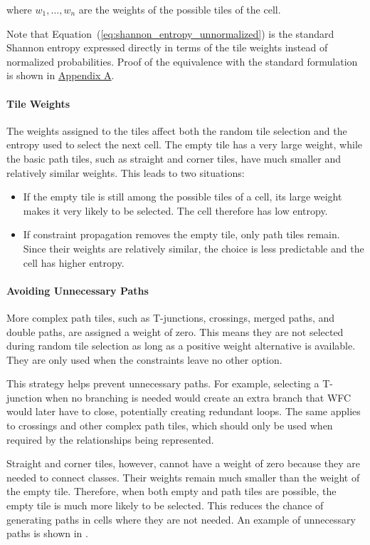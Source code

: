 \documentclass[../../main.tex]{subfiles}
\begin{document}
where $w_1,\ldots,w_n$ are the weights of the possible tiles of the cell.

\noindent Note that Equation~(\ref{eq:shannon_entropy_unnormalized}) is the standard Shannon entropy expressed directly in terms of the tile weights instead of normalized probabilities. Proof of the equivalence with the standard formulation is shown in \hyperref[cha:appendix_entropy]{Appendix A}.

\paragraph{Tile Weights}
The weights assigned to the tiles affect both the random tile selection and the entropy used to select the next cell. The empty tile has a very large weight, while the basic path tiles, such as straight and corner tiles, have much smaller and relatively similar weights. This leads to two situations:

\begin{itemize}
    \item If the empty tile is still among the possible tiles of a cell, its large weight makes it very likely to be selected. The cell therefore has low entropy.
    \item If constraint propagation removes the empty tile, only path tiles remain. Since their weights are relatively similar, the choice is less predictable and the cell has higher entropy.
\end{itemize}

\paragraph{Avoiding Unnecessary Paths}
More complex path tiles, such as T-junctions, crossings, merged paths, and double paths, are assigned a weight of zero. This means they are not selected during random tile selection as long as a positive weight alternative is available. They are only used when the constraints leave no other option.

This strategy helps prevent unnecessary paths. For example, selecting a T-junction when no branching is needed would create an extra branch that WFC would later have to close, potentially creating redundant loops. The same applies to crossings and other complex path tiles, which should only be used when required by the relationships being represented.

Straight and corner tiles, however, cannot have a weight of zero because they are needed to connect classes. Their weights remain much smaller than the weight of the empty tile. Therefore, when both empty and path tiles are possible, the empty tile is much more likely to be selected. This reduces the chance of generating paths in cells where they are not needed. An example of unnecessary paths is shown in .
\end{document}

